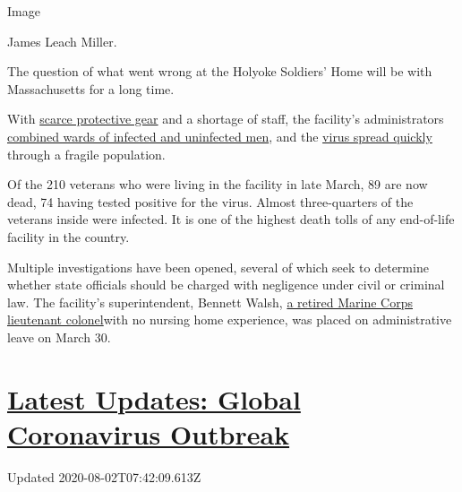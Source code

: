 Image

James Leach Miller.

The question of what went wrong at the Holyoke Soldiers' Home will be
with Massachusetts for a long time.

With
\href{https://www.wbur.org/news/2020/05/01/holyoke-soldiers-home-coronavirus-cases-deaths-outage-families}{scarce
protective gear} and a shortage of staff, the facility's administrators
\href{https://www.masslive.com/coronavirus/2020/05/staffing-concerns-predated-coronavirus-outbreak-at-holyoke-soldiers-home.html}{combined
wards of infected and uninfected men}, and the
\href{https://www.propublica.org/article/superintendent-bragged-about-va-review-of-short-staffed-soldiers-home-two-months-later-73-veterans-are-dead}{virus
spread quickly} through a fragile population.

Of the 210 veterans who were living in the facility in late March, 89
are now dead, 74 having tested positive for the virus. Almost
three-quarters of the veterans inside were infected. It is one of the
highest death tolls of any end-of-life facility in the country.

Multiple investigations have been opened, several of which seek to
determine whether state officials should be charged with negligence
under civil or criminal law. The facility's superintendent, Bennett
Walsh,
\href{https://www.bostonglobe.com/2020/05/02/metro/holyoke-soldiers-home-has-been-overlooked-understaffed-led-by-inexperience/}{a
retired Marine Corps lieutenant colonel}with no nursing home experience,
was placed on administrative leave on March 30.

\hypertarget{latest-updates-global-coronavirus-outbreak}{%
\section{\texorpdfstring{\href{https://www.nytimes.com/2020/08/01/world/coronavirus-covid-19.html?action=click\&pgtype=Article\&state=default\&region=MAIN_CONTENT_1\&context=storylines_live_updates}{Latest
Updates: Global Coronavirus
Outbreak}}{Latest Updates: Global Coronavirus Outbreak}}\label{latest-updates-global-coronavirus-outbreak}}

Updated 2020-08-02T07:42:09.613Z

